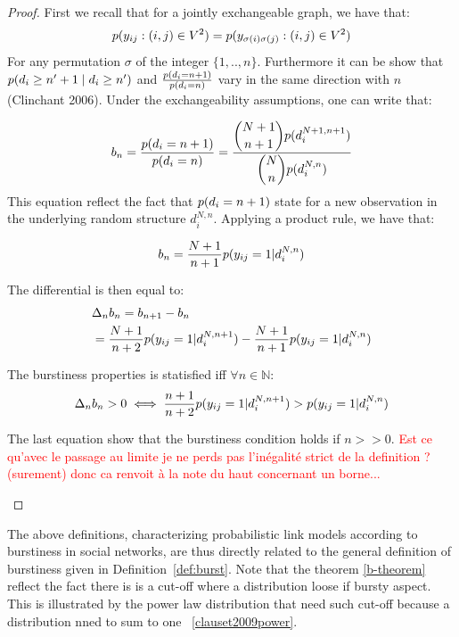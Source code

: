 \begin{proof}
	First we recall that for a jointly exchangeable graph, we have that:
	\begin{equation*}
	p(y_{ij}: (i,j) \in V^2) = p(y_{\sigma(i)\sigma(j)}: (i,j) \in V^2)
	\end{equation*}
	For any permutation $\sigma$ of the integer $\{1,..,n\}$. Furthermore it can be show that $ p(d_i \geq n'+1 \mid d_i \geq n')$ and $\frac{p(d_i=n+1)}{p(d_i=n)}$ vary in the same direction with $n$ (Clinchant 2006). Under the exchangeability assumptions, one can write that:
	
	\begin{align*}
	 b_n=\frac{p(d_i=n+1)}{p(d_i=n)} = \frac{\dbinom{N+1}{n+1} p(d_i^{N+1,n+1})}{\dbinom{N}{n} p(d_i^{N,n})}
	\end{align*}
	This equation reflect the fact that $p(d_i=n+1)$ state for a new observation in the underlying random structure $d_i^{N,n}$. Applying a product rule, we have that:
	
	\begin{equation*}
	b_n = \frac{N+1}{n+1} p(y_{ij}=1 | d_i^{N,n})
	\end{equation*}
	
	The differential is then equal to:
	\begin{align*}
	&\Delta_n b_n= b_{n+1} - b_n  \\
	&= \frac{N+1}{n+2} p(y_{ij}=1 | d_i^{N,n+1}) - \frac{N+1}{n+1} p(y_{ij}=1 | d_i^{N,n})
	\end{align*}
	
	The burstiness properties is statisfied iff $\forall n \in \mathbb{N}$:
	\begin{align*}
	\Delta_nb_n > 0 \iff \frac{n+1}{n+2}p(y_{ij}=1 | d_i^{N,n+1})  > p(y_{ij}=1 | d_i^{N,n})
	\end{align*}
	
	The last equation show that the burstiness condition holds if $n >> 0$.
	\textcolor{red}{Est ce qu'avec le passage au limite je ne perds pas l'inégalité strict de la definition ? (surement) donc ca renvoit à la note du haut concernant un borne...}

\label{b-theorem}
\end{proof}

The above definitions, characterizing probabilistic link models according to burstiness in social networks, are thus directly related to the general definition of burstiness given in Definition~\ref{def:burst}. Note that the theorem \ref{b-theorem} reflect the fact there is is a cut-off where a distribution loose if bursty aspect. This is illustrated by the power law distribution that need such cut-off because a distribution nned to sum to one  \ref{clauset2009power}.


